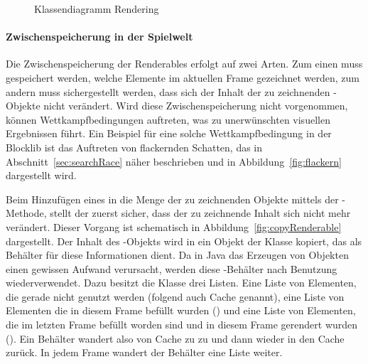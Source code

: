 \begin{figure}
	\centering
	
	\caption{Klassendiagramm Rendering}\label{fig:renderInterfaceDiagram}
\end{figure}

\paragraph{Zwischenspeicherung in der Spielwelt} Die Zwischenspeicherung der Renderables erfolgt auf zwei Arten. Zum einen muss gespeichert werden, welche Elemente im aktuellen Frame gezeichnet werden, zum andern muss sichergestellt werden, dass sich der Inhalt der zu zeichnenden -Objekte nicht verändert. Wird diese Zwischenspeicherung nicht vorgenommen, können Wettkampfbedingungen auftreten, was zu unerwünschten visuellen Ergebnissen führt. Ein Beispiel für eine solche Wettkampfbedingung in der Blocklib ist das Auftreten von flackernden Schatten, das in Abschnitt~\ref{sec:searchRace} näher beschrieben und in Abbildung~\vref{fig:flackern} dargestellt wird.

Beim Hinzufügen eines  in die Menge der zu zeichnenden Objekte mittels der -Methode, stellt der  zuerst sicher, dass der zu zeichnende Inhalt sich nicht mehr verändert. Dieser Vorgang ist schematisch in Abbildung~\vref{fig:copyRenderable} dargestellt. Der Inhalt des -Objekts wird in ein Objekt der Klasse  kopiert, das als Behälter für diese Informationen dient. Da in Java das Erzeugen von Objekten einen gewissen Aufwand verursacht, werden diese -Behälter nach Benutzung wiederverwendet. Dazu besitzt die Klasse  drei Listen. Eine Liste von Elementen, die gerade nicht genutzt werden (folgend auch Cache genannt), eine Liste von Elementen die in diesem Frame befüllt wurden () und eine Liste von Elementen, die im letzten Frame befüllt worden sind und in diesem Frame gerendert wurden (). Ein Behälter wandert also von Cache zu  zu  und dann wieder in den Cache zurück. In jedem Frame wandert der Behälter eine Liste weiter.

